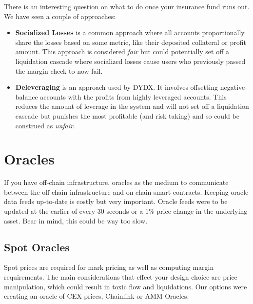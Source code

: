 \documentclass{article}
\begin{document}
\noindent There is an interesting question on what to do once your insurance fund runs out. We have seen a couple of approaches:
\begin{itemize}
    \item \textbf{Socialized Losses} is a common approach where all accounts proportionally share the losses based on some metric, like their deposited collateral or profit amount. This approach is considered \textit{fair} but could potentially set off a liquidation cascade where socialized losses cause users who previously passed the margin check to now fail.
    \item \textbf{Deleveraging} is an approach used by DYDX. It involves offsetting negative-balance accounts with the profits from highly leveraged accounts. This reduces the amount of leverage in the system and will not set off a liquidation cascade but punishes the most profitable (and risk taking) and so could be construed as \textit{unfair}.
\end{itemize}

\section{Oracles}
\label{sec:oracles}

\noindent If you have off-chain infrastructure, oracles as the medium to communicate between the off-chain infrastructure and on-chain smart contracts. Keeping oracle data feeds up-to-date is costly but very important. Oracle feeds were to be updated at the earlier of every 30 seconds or a 1\% price change in the underlying asset. Bear in mind, this could be way too slow. 

\subsection{Spot Oracles}

\noindent Spot prices are required for mark pricing as well as computing margin requirements. The main considerations that effect your design choice are price manipulation, which could result in toxic flow and liquidations. Our options were creating an oracle of CEX prices, Chainlink or AMM Oracles. \\
\end{document}
